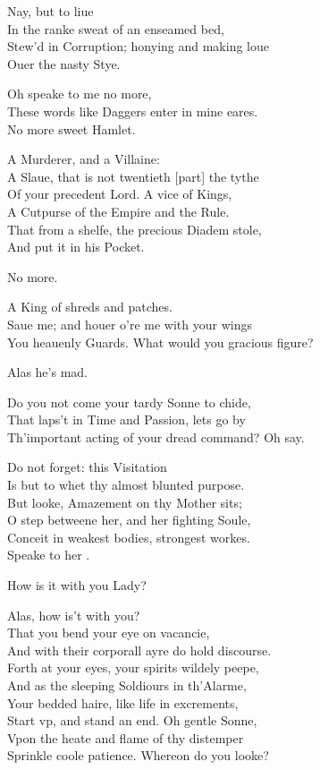 \documentclass[a5paper,DIV=calc,11pt]{scrbook}
\begin{document}
\begin{drama*}
    \hamspeaks Nay, but to liue\\
    In the ranke sweat of an enseamed bed,\\
    Stew'd in Corruption; honying and making loue\\
    Ouer the nasty Stye.
    
    \queenspeaks Oh speake to me no more,\\
    These words like Daggers enter in mine eares.\\
    No more sweet Hamlet.
    
    \hamspeaks A Murderer, and a Villaine:\\
    A Slaue, that is not twentieth [part] the tythe\\
    Of your precedent Lord. A vice of Kings,\\
    A Cutpurse of the Empire and the Rule.\\
    That from a shelfe, the precious Diadem stole,\\
    And put it in his Pocket.
    
    \queenspeaks No more.
    
    
    \hamspeaks A King of shreds and patches.\\
    Saue me; and houer o're me with your wings\\
    You heauenly Guards. What would you gracious figure?
    
    \queenspeaks Alas he's mad.
    
    \hamspeaks Do you not come your tardy Sonne to chide,\\
    That laps't in Time and Passion, lets go by\\
    Th'important acting of your dread command? Oh say.
    
    \ghospeaks Do not forget: this Visitation\\
    Is but to whet thy almost blunted purpose.\\
    But looke, Amazement on thy Mother sits;\\
    O step betweene her, and her fighting Soule,\\
    Conceit in weakest bodies, strongest workes.\\
    Speake to her \ham.
    
    \hamspeaks How is it with you Lady?
    
    \queenspeaks Alas, how is't with you?\\
    That you bend your eye on vacancie,\\
    And with their corporall ayre do hold discourse.\\
    Forth at your eyes, your spirits wildely peepe,\\
    And as the sleeping Soldiours in th'Alarme,\\
    Your bedded haire, like life in excrements,\\
    Start vp, and stand an end. Oh gentle Sonne,\\
    Vpon the heate and flame of thy distemper\\
    Sprinkle coole patience. Whereon do you looke?
    

\end{drama*}
\end{document}
